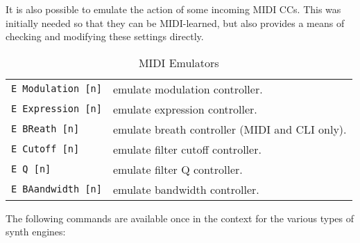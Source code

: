    It is also possible to emulate the action of some incoming MIDI CCs. This
   was initially needed so that they can be MIDI-learned, but also provides
   a means of checking and modifying these settings directly.

   \begin{table}[H]
      \centering
      \caption{MIDI Emulators}
      \label{table:yoshimi_part_midi_emulators}
      \begin{tabular}{l l}
\texttt{E Modulation [n]} &
   emulate modulation controller. \\
\texttt{E Expression [n]} &
   emulate expression controller. \\
\texttt{E BReath [n]} &
   emulate breath controller (MIDI and CLI only). \\
\texttt{E Cutoff [n]} &
   emulate filter cutoff controller. \\
\texttt{E Q [n]} &
   emulate filter Q controller. \\
\texttt{E BAandwidth [n]} &
   emulate bandwidth controller. \\
      \end{tabular}
   \end{table}

   The following commands are available once in the context for the various
   types of synth engines:


